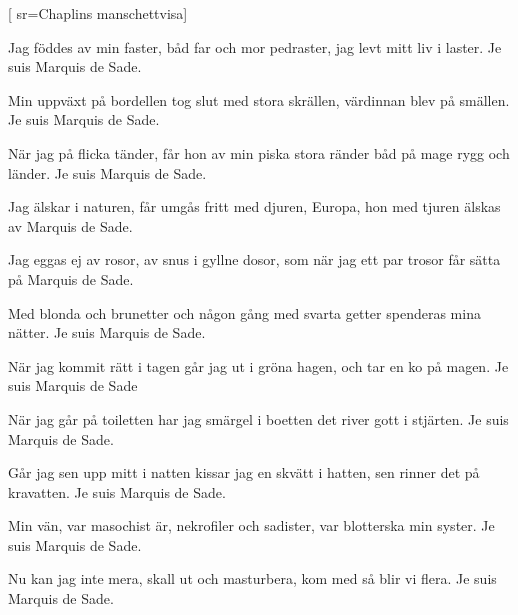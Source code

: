 


[	%
	sr={Chaplins manschettvisa}]	%
	
\beginverse*		%
Jag föddes av min faster,
båd far och mor pedraster,
jag levt mitt liv i laster.
Je suis Marquis de Sade.
\endverse			%

\beginverse*		%
Min uppväxt på bordellen
tog slut med stora skrällen,
värdinnan blev på smällen.
Je suis Marquis de Sade.
\endverse			%

\beginverse*		%
När jag på flicka tänder,
får hon av min piska stora ränder
båd på mage rygg och länder.
Je suis Marquis de Sade.
\endverse			%

\beginverse*		%
Jag älskar i naturen,
får umgås fritt med djuren,
Europa, hon med tjuren
älskas av Marquis de Sade.
\endverse			%

\beginverse*		%
Jag eggas ej av rosor,
av snus i gyllne dosor,
som när jag ett par trosor
får sätta på Marquis de Sade.
\endverse			%

\beginverse*		%
Med blonda och brunetter
och någon gång med svarta getter
spenderas mina nätter.
Je suis Marquis de Sade.
\endverse			%

\beginverse*		%
När jag kommit rätt i tagen
går jag ut i gröna hagen,
och tar en ko på magen.
Je suis Marquis de Sade
\endverse			%

\beginverse*		%
När jag går på toiletten
har jag smärgel i boetten
det river gott i stjärten.
Je suis Marquis de Sade.
\endverse			%

\beginverse*		%
Går jag sen upp mitt i natten
kissar jag en skvätt i hatten,
sen rinner det på kravatten.
Je suis Marquis de Sade.
\endverse			%

\beginverse*		%
Min vän, var masochist är,
nekrofiler och sadister,
var blotterska min syster.
Je suis Marquis de Sade.
\endverse			%

\beginverse*		%
Nu kan jag inte mera,
skall ut och masturbera,
kom med så blir vi flera.
Je suis Marquis de Sade.
\endverse			%
\endsong			%
